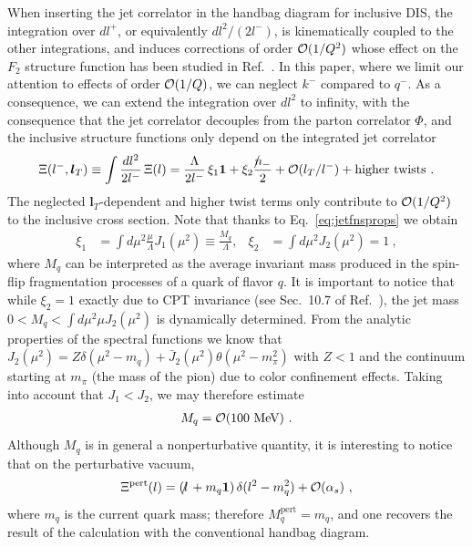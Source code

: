 \documentclass[preprintnumbers,floatfix,nofootinbib]{revtex4}
\newcommand{\lslash}{l \hspace{-0.19cm} / \,}
\newcommand{\nslash}{n \hspace{-0.24cm} / \,}
\newcommand{\mj}{M_q}
\newcommand{\mq}{m_q}
\newcommand{\id}{{\bm 1}
}
\begin{document}
When inserting the jet correlator in the handbag diagram for inclusive DIS, the integration over $dl^+$, or equivalently $dl^2/(2l^-)$, is kinematically coupled to the other integrations, and induces corrections of order ${\cal O}(1/Q^2)$ whose effect on the $F_2$ structure function has been studied in Ref.~\cite{Accardi:2008ne}. In this paper, where we limit our
attention to effects of order ${\cal O}(1/Q)$, we can neglect $k^-$ compared to $q^-$. As a consequence, we can extend the integration over $dl^2$ to infinity, with the consequence that the jet correlator decouples from the parton correlator $\Phi$, and the inclusive structure functions only depend on the integrated jet correlator 
\begin{equation} 
  \Xi(l^-,{\bm l_T}) \equiv \int \frac{dl^2}{2l^-} \, \Xi(l) 
    =  \frac{\Lambda}{2 l^-}\,\xi_1 \id
    +  \xi_2 \frac{\nslash_-}{2} 
    + {\cal O}(l_T/l^-) + \text{higher\ twists} \ .
\end{equation} 
The neglected ${\bm l_T}$-dependent and higher twist terms only contribute to ${\cal O}(1/Q^2)$ to the inclusive cross section. Note that thanks to Eq.~\eqref{eq:jetfnsprops} we obtain
\begin{align}
\xi_1 &= \int d\mu^2 \frac{\mu}{\Lambda} J_1(\mu^2) 
       \equiv \frac{\mj}{\Lambda},
&
\xi_2 &= \int d\mu^2 J_2(\mu^2) = 1 \ ,
\end{align} 
where $\mj$ can be interpreted as the average invariant mass produced in the spin-flip fragmentation processes of a quark of flavor $q$.
It is important to notice that while $\xi_2=1$ exactly due to CPT invariance
(see Sec.~10.7 of Ref.~\cite{Weinberg:1995mt}), the jet mass $0 < \mj < \int d\mu^2 \mu J_2(\mu^2)$ is dynamically determined. From the analytic properties of the spectral functions we know that $J_2(\mu^2) = Z \delta(\mu^2-m_q) + \bar J_2(\mu^2) \theta (\mu^2-m_\pi^2)$ with $Z<1$ and the continuum starting at $m_\pi$ (the mass of the pion) due to color confinement effects. Taking into account that $J_1 < J_2$, we may therefore estimate 
\begin{align}
  \label{eq:mjet}
  \mj = {\cal O}(100 \text{\ MeV}) \ .
\end{align}
Although $\mj$ is in general a nonperturbative quantity, it is interesting to
notice that on the perturbative vacuum, 
\begin{align*}
  \Xi^\text{pert}(l) = (\lslash + \mq \id) \, \delta(l^2-m_q^2) + {\cal O}(\alpha_s) \ ,
\end{align*}
where $\mq$ is the current quark mass; therefore $\mj^\text{pert}=m_q$, and one recovers the result of the calculation with the conventional handbag diagram.
\end{document}
